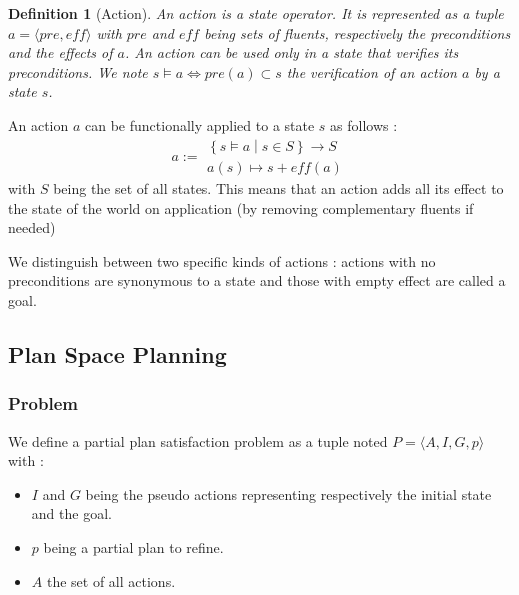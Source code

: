 \documentclass[]{article}
\providecommand{\tightlist}{%
  \setlength{\itemsep}{0pt}\setlength{\parskip}{0pt}}
\newtheorem{definition}{Definition}
\begin{document}
\begin{definition}[Action]

An action is a state operator. It is represented as a tuple
\(a = \langle pre, eff \rangle\) with \(pre\) and \(eff\) being sets of
fluents, respectively the preconditions and the effects of \(a\). An
action can be used only in a state that verifies its preconditions. We
note \(s \models a \Leftrightarrow pre(a) \subset s\) the verification
of an action \(a\) by a state \(s\).

\end{definition}

An action \(a\) can be functionally applied to a state \(s\) as follows
: \[a:= \substack{ \left\{ s \models a \middle| s \in S\right\} \to S\\
    a(s) \mapsto s + eff(a)}\] with \(S\) being the set of all states.
This means that an action adds all its effect to the state of the world
on application (by removing complementary fluents if needed)

We distinguish between two specific kinds of actions : actions with no
preconditions are synonymous to a state and those with empty effect are
called a goal.

\subsection{Plan Space Planning}\label{plan-space-planning}

\subsubsection{Problem}\label{problem}

We define a partial plan satisfaction problem as a tuple noted
\(P = \langle A, I, G, p \rangle\) with :

\begin{itemize}
\tightlist
\item
  \(I\) and \(G\) being the pseudo actions representing respectively the
  initial state and the goal.
\item
  \(p\) being a partial plan to refine.
\item
  \(A\) the set of all actions.
\end{itemize}
\end{document}
